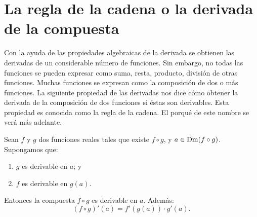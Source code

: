 \section{La regla de la cadena o la derivada de la compuesta}
Con la ayuda de las propiedades algebraicas de la derivada se obtienen las derivadas de un
considerable número de funciones. Sin embargo, no todas las funciones se pueden expresar como suma,
resta, producto, división de otras funciones. Muchas funciones se expresan como la composición de
dos o más funciones. La siguiente propiedad de las derivadas nos dice cómo obtener la derivada de
la composición de dos funciones si éstas son derivables. Esta propiedad es conocida como la regla
de la cadena. El porqué de este nombre se verá más adelante.

\begin{teocal}
Sean $f$ y $g$ dos funciones reales tales que existe $f\circ g$, y $a\in\operatorname{Dm}(f\circ g)$. Supongamos
que:
\begin{enumerate}
\item $g$ es derivable en $a$; y
\item $f$ es derivable en $g(a)$.
\end{enumerate}
Entonces la compuesta $f\circ g$ es derivable en $a$. Además:
\[
(f\circ g)'(a) = f'(g(a))\cdot g'(a).
\]
\end{teocal}

